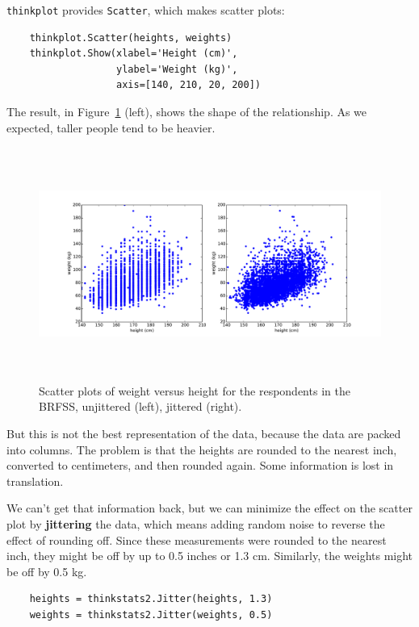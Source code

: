 \documentclass[12pt]{book}
\begin{document}
{\tt thinkplot} provides {\tt Scatter}, which makes scatter plots:
%
\begin{verbatim}
    thinkplot.Scatter(heights, weights)
    thinkplot.Show(xlabel='Height (cm)',
                   ylabel='Weight (kg)',
                   axis=[140, 210, 20, 200])
\end{verbatim}

The result, in Figure~\ref{scatter1} (left), shows the shape of
the relationship.  As we expected, taller
people tend to be heavier.  

\begin{figure}
\centerline{\includegraphics[height=3.0in]{figs/scatter1.pdf}}
\caption{Scatter plots of weight versus height for the respondents
in the BRFSS, unjittered (left), jittered (right).}
\label{scatter1}
\end{figure}

But this is not the best representation of
the data, because the data are packed into columns.  The problem is
that the heights are rounded to the nearest inch, converted to
centimeters, and then rounded again.  Some information is lost in
translation.    

We can't get that information back, but we can minimize the effect on
the scatter plot by {\bf jittering} the data, which means adding random
noise to reverse the effect of rounding off.  Since these measurements
were rounded to the nearest inch, they might be off by up to 0.5 inches or
1.3 cm.  Similarly, the weights might be off by 0.5 kg.

%
\begin{verbatim}
    heights = thinkstats2.Jitter(heights, 1.3)
    weights = thinkstats2.Jitter(weights, 0.5)
\end{verbatim}
\end{document}
